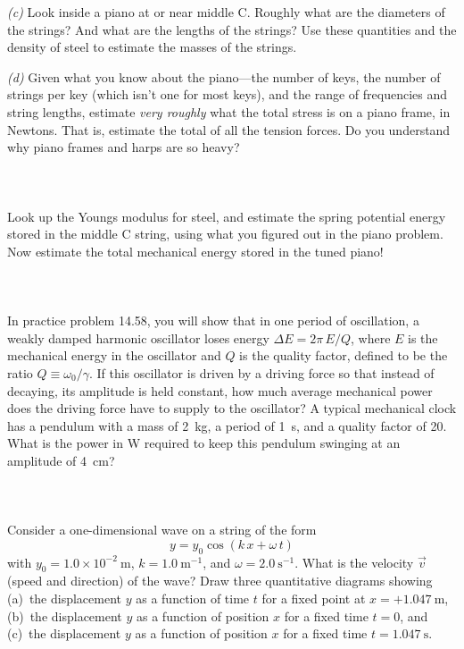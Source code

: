 \documentclass[12pt]{article}
\newcounter{problem}
\begin{document}
\textsl{(c)} Look inside a piano at or near middle C. Roughly what are
the diameters of the strings? And what are the lengths of the strings?
Use these quantities and the density of steel to estimate the masses
of the strings.

\textsl{(d)} Given what you know about the piano---the number of keys,
the number of strings per key (which isn't one for most keys), and the
range of frequencies and string lengths, estimate \emph{very roughly}
what the total stress is on a piano frame, in Newtons. That is,
estimate the total of all the tension forces. Do you understand why
piano frames and harps are so heavy?

\paragraph{\problemname~\theproblem}
Look up the Youngs modulus for steel, and estimate the spring
potential energy stored in the middle C string, using what you figured
out in the piano problem. Now estimate the total mechanical energy
stored in the tuned piano!

\paragraph{\problemname~\theproblem}

In practice problem 14.58, you will show that in one period of
oscillation, a weakly damped harmonic oscillator loses energy $\Delta
E = 2\pi\,E/Q$, where $E$ is the mechanical energy in the oscillator
and $Q$ is the quality factor, defined to be the ratio
$Q\equiv\omega_0/\gamma$.  If this oscillator is driven by a driving
force so that instead of decaying, its amplitude is held constant, how
much average mechanical power does the driving force have to supply to
the oscillator?  A typical mechanical clock has a pendulum with a mass
of 2~kg, a period of 1~s, and a quality factor of 20.  What is the
power in W required to keep this pendulum swinging at an amplitude of
4~cm?

\paragraph{\problemname~\theproblem}

Consider a one-dimensional wave on a string of the form
\begin{equation}
y = y_0 \cos(k\,x + \omega\,t)
\end{equation}
with $y_0= 1.0\times 10^{-2}~\mathrm{m}$, $k= 1.0~\mathrm{m^{-1}}$,
and $\omega= 2.0~\mathrm{s^{-1}}$.  What is the velocity $\vec{v}$
(speed and direction) of the wave?  Draw three quantitative diagrams
showing (a)~the displacement $y$ as a function of time $t$ for a fixed
point at $x= +1.047~\mathrm{m}$, (b)~the displacement $y$ as a
function of position $x$ for a fixed time $t=0$, and (c)~the
displacement $y$ as a function of position $x$ for a fixed time $t=
1.047~\mathrm{s}$.
\end{document}
